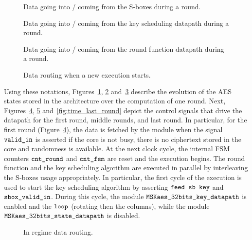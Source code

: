 \documentclass{scrartcl}
\begin{document}
\begin{figure}
    \centering
    
    \caption{Data going into / coming from the S-boxes during a round.}
    \label{fig:pipe_sbox}
\end{figure}

\begin{figure}
    \centering
    
    \caption{Data going into / coming from the key scheduling datapath during a round.}
    \label{fig:pipe_dpkey}
\end{figure}

\begin{figure}
    \centering
    
    \caption{Data going into / coming from the round function datapath during a round.}
    \label{fig:pipe_dpstate}
\end{figure}

\begin{figure}
    \centering
     
    \caption{Data routing when a new execution starts.}
    \label{fig:time_first_round}
\end{figure}

Using these notations, Figures~\ref{fig:pipe_sbox}, \ref{fig:pipe_dpkey}
and~\ref{fig:pipe_dpstate} describe the evolution of the AES states stored in
the architecture over the computation of one round.
Next, Figures~\ref{fig:time_first_round}, \ref{fig:time_regime}
and~\ref{fig:time_last_round} depict the control signals that drive the
datapath for the first round, middle rounds, and last round.
In particular, for the first round (Figure~\ref{fig:time_first_round}), the
data is fetched by the module when the signal $\texttt{valid\_in}$ is asserted if
the core is not busy, there is no ciphertext stored in the core and randomness
is available.
At the next clock cycle, the
internal FSM counters $\texttt{cnt\_round}$ and $\texttt{cnt\_fsm}$ are reset and the
execution begins. The round function and the key scheduling algorithm are
executed in parallel by interleaving the S-boxes usage appropriately. In
particular, the first cycle of the execution is used to start the key
scheduling algorithm by asserting $\texttt{feed\_sb\_key}$ and $\texttt{sbox\_valid\_in}$.
During this cycle, the module $\texttt{MSKaes\_32bits\_key\_datapath}$ is enabled and the
$\texttt{loop}$ (rotating then the columns), while the module $\texttt{MSKaes\_32bits\_state\_datapath}$
is disabled.
\begin{figure}
    \centering
     
    \caption{In regime data routing.}
    \label{fig:time_regime}
\end{figure}
\end{document}
